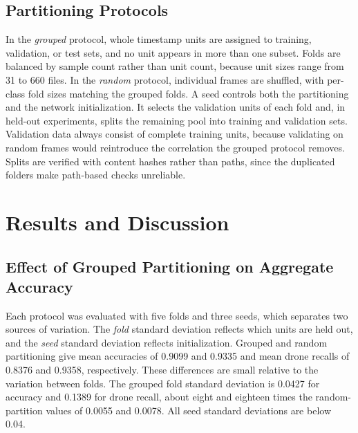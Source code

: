 \documentclass{ICIC2026}
\begin{document}
\subsection{Partitioning Protocols}

In the \emph{grouped} protocol, whole timestamp units are assigned to training, validation, or test sets, and no unit appears in more than one subset. Folds are balanced by sample count rather than unit count, because unit sizes range from 31 to 660 files. In the \emph{random} protocol, individual frames are shuffled, with per-class fold sizes matching the grouped folds. A seed controls both the partitioning and the network initialization. It selects the validation units of each fold and, in held-out experiments, splits the remaining pool into training and validation sets. Validation data always consist of complete training units, because validating on random frames would reintroduce the correlation the grouped protocol removes. Splits are verified with content hashes rather than paths, since the duplicated folders make path-based checks unreliable.

\section{Results and Discussion}
\label{sec:results}

\subsection{Effect of Grouped Partitioning on Aggregate Accuracy}
\label{sec:leak}

Each protocol was evaluated with five folds and three seeds, which separates two sources of variation. The \emph{fold} standard deviation reflects which units are held out, and the \emph{seed} standard deviation reflects initialization. Grouped and random partitioning give mean accuracies of 0.9099 and 0.9335 and mean drone recalls of 0.8376 and 0.9358, respectively. These differences are small relative to the variation between folds. The grouped fold standard deviation is 0.0427 for accuracy and 0.1389 for drone recall, about eight and eighteen times the random-partition values of 0.0055 and 0.0078. All seed standard deviations are below 0.04.
\end{document}
